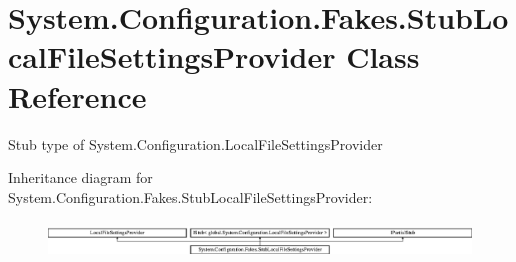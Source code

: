 \hypertarget{class_system_1_1_configuration_1_1_fakes_1_1_stub_local_file_settings_provider}{\section{System.\-Configuration.\-Fakes.\-Stub\-Local\-File\-Settings\-Provider Class Reference}
\label{class_system_1_1_configuration_1_1_fakes_1_1_stub_local_file_settings_provider}
}


Stub type of System.\-Configuration.\-Local\-File\-Settings\-Provider 


Inheritance diagram for System.\-Configuration.\-Fakes.\-Stub\-Local\-File\-Settings\-Provider\-:\begin{figure}[H]
\begin{center}
\leavevmode
\includegraphics[height=0.985048cm]{class_system_1_1_configuration_1_1_fakes_1_1_stub_local_file_settings_provider}
\end{center}
\end{figure}
